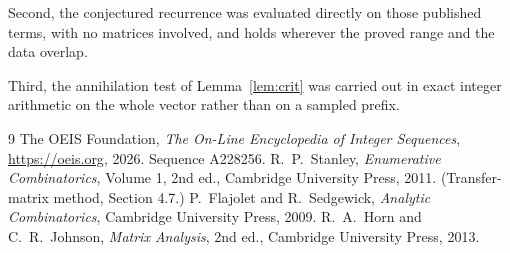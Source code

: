 \documentclass[11pt,a4paper]{article}
\theoremstyle{plain}
\theoremstyle{definition}
\begin{document}
Second, the conjectured recurrence was evaluated directly on those published terms, with no
matrices involved, and holds wherever the proved range and the data overlap.

Third, the annihilation test of Lemma~\ref{lem:crit} was carried out in exact integer
arithmetic on the whole vector rather than on a sampled prefix.

\begin{thebibliography}{9}
 The OEIS Foundation, \emph{The On-Line Encyclopedia of Integer
Sequences}, \url{https://oeis.org}, 2026. Sequence A228256.
 R.~P.~Stanley, \emph{Enumerative Combinatorics}, Volume 1, 2nd ed.,
Cambridge University Press, 2011. (Transfer-matrix method, Section 4.7.)
 P.~Flajolet and R.~Sedgewick, \emph{Analytic Combinatorics}, Cambridge
University Press, 2009.
 R.~A.~Horn and C.~R.~Johnson, \emph{Matrix Analysis}, 2nd ed., Cambridge
University Press, 2013.
\end{thebibliography}
\end{document}
